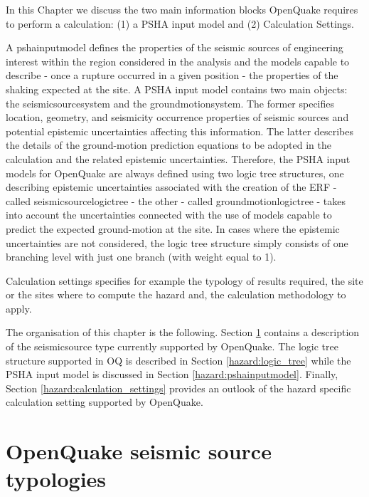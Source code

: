 %
%
In this Chapter we discuss the two main information blocks OpenQuake 
requires to perform a calculation: (1) a PSHA input model and (2) 
Calculation Settings.

A \gls{pshainputmodel} defines the properties of the seismic sources 
of engineering  interest within the region considered in the analysis and the 
models capable to describe - once a rupture occurred in a given position - the 
properties of the shaking expected at the site. 
%
A PSHA input model contains two main objects: the \gls{seismicsourcesystem} 
and the \gls{groundmotionsystem}. 
%
The former specifies location, geometry, and seismicity occurrence properties 
of seismic sources and potential epistemic uncertainties affecting this 
information. 
%
The latter describes the details of the ground-motion prediction equations to 
be adopted in the calculation and the related epistemic uncertainties. 
%
Therefore, the PSHA input models for OpenQuake are always defined using two 
logic tree structures, one describing epistemic uncertainties associated 
with the creation of the ERF - called \gls{seismicsourcelogictree} - 
the other - called \gls{groundmotionlogictree} - takes into account 
the uncertainties connected with the use of models capable to predict the 
expected ground-motion at the site. 
%
In cases where the epistemic uncertainties are not considered, the logic tree 
structure simply consists of one branching level with just one branch (with 
weight equal to 1).

Calculation settings specifies for example the typology of results required,
the site or the sites where to compute the hazard and, the calculation
methodology to apply.

The organisation of this chapter is the following.  
Section \ref{hazard:seismic_source_types} contains a description of the 
seismicsource type currently supported by OpenQuake. 
The logic tree structure supported in OQ is described in Section 
\ref{hazard:logic_tree} while the PSHA input model is discussed in 
Section \ref{hazard:pshainputmodel}.
Finally, Section \ref{hazard:calculation_settings} provides an outlook 
of the hazard specific calculation setting supported by OpenQuake.
%
\section[OpenQuake seismic source typologies]{OpenQuake seismic source 
typologies}
\label{hazard:seismic_source_types}

%
